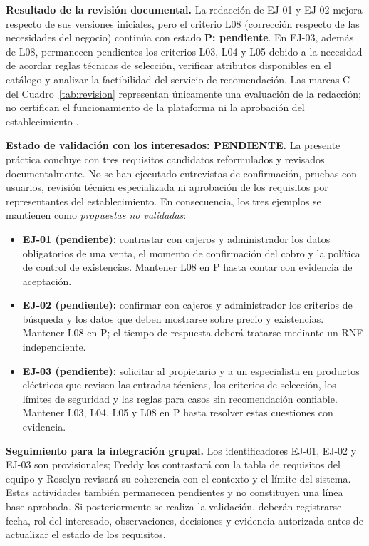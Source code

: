 \documentclass[onecolumn,12pt,a4paper]{IEEEtran}
\begin{document}
\textbf{Resultado de la revisión documental.} La redacción de EJ-01 y EJ-02 mejora respecto de sus versiones iniciales, pero el criterio L08 (corrección respecto de las necesidades del negocio) continúa con estado \textbf{P: pendiente}. En EJ-03, además de L08, permanecen pendientes los criterios L03, L04 y L05 debido a la necesidad de acordar reglas técnicas de selección, verificar atributos disponibles en el catálogo y analizar la factibilidad del servicio de recomendación. Las marcas C del Cuadro~\ref{tab:revision} representan únicamente una evaluación de la redacción; no certifican el funcionamiento de la plataforma ni la aprobación del establecimiento \cite{iso29148,pohl2025}.

\noindent\textbf{Estado de validación con los interesados: PENDIENTE.} La presente práctica concluye con tres requisitos candidatos reformulados y revisados documentalmente. No se han ejecutado entrevistas de confirmación, pruebas con usuarios, revisión técnica especializada ni aprobación de los requisitos por representantes del establecimiento. En consecuencia, los tres ejemplos se mantienen como \emph{propuestas no validadas}:
\begin{itemize}
  \item \textbf{EJ-01 (pendiente):} contrastar con cajeros y administrador los datos obligatorios de una venta, el momento de confirmación del cobro y la política de control de existencias. Mantener L08 en P hasta contar con evidencia de aceptación.
  \item \textbf{EJ-02 (pendiente):} confirmar con cajeros y administrador los criterios de búsqueda y los datos que deben mostrarse sobre precio y existencias. Mantener L08 en P; el tiempo de respuesta deberá tratarse mediante un RNF independiente.
  \item \textbf{EJ-03 (pendiente):} solicitar al propietario y a un especialista en productos eléctricos que revisen las entradas técnicas, los criterios de selección, los límites de seguridad y las reglas para casos sin recomendación confiable. Mantener L03, L04, L05 y L08 en P hasta resolver estas cuestiones con evidencia.
\end{itemize}
\noindent\textbf{Seguimiento para la integración grupal.} Los identificadores EJ-01, EJ-02 y EJ-03 son provisionales; Freddy los contrastará con la tabla de requisitos del equipo y Roselyn revisará su coherencia con el contexto y el límite del sistema. Estas actividades también permanecen pendientes y no constituyen una línea base aprobada. Si posteriormente se realiza la validación, deberán registrarse fecha, rol del interesado, observaciones, decisiones y evidencia autorizada antes de actualizar el estado de los requisitos.
\end{document}
